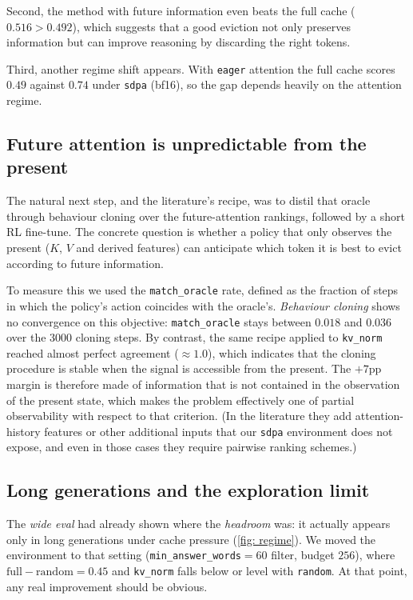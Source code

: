 Second, the method with future information even beats the full cache ($0.516 > 0.492$), which suggests that a good eviction not only preserves information but can improve reasoning by discarding the right tokens.

Third, another regime shift appears. With \texttt{eager} attention the full cache scores $0.49$ against $0.74$ under \texttt{sdpa} (bf16), so the gap depends heavily on the attention regime.

\subsection{Future attention is unpredictable from the present} \label{subsec: e5}

The natural next step, and the literature's recipe, was to distil that oracle through behaviour cloning over the future-attention rankings, followed by a short RL fine-tune. The concrete question is whether a policy that only observes the present ($K$, $V$ and derived features) can anticipate which token it is best to evict according to future information.

To measure this we used the \texttt{match\_oracle} rate, defined as the fraction of steps in which the policy's action coincides with the oracle's. \textit{Behaviour cloning} shows no convergence on this objective: \texttt{match\_oracle} stays between $0.018$ and $0.036$ over the 3000 cloning steps. By contrast, the same recipe applied to \texttt{kv\_norm} reached almost perfect agreement ($\approx 1.0$), which indicates that the cloning procedure is stable when the signal is accessible from the present.
The $+7$pp margin is therefore made of information that is not contained in the observation of the present state, which makes the problem effectively one of partial observability with respect to that criterion.
(In the literature they add attention-history features or other additional inputs that our \texttt{sdpa} environment does not expose, and even in those cases they require pairwise ranking schemes.)

\subsection{Long generations and the exploration limit} \label{subsec: longgen}

The \textit{wide eval} had already shown where the \textit{headroom} was: it actually appears only in long generations under cache pressure (\cref{fig: regime}). We moved the environment to that setting (\texttt{min\_answer\_words}$=60$ filter, budget $256$), where $\mathrm{full}-\mathrm{random}=0.45$ and \texttt{kv\_norm} falls below or level with \texttt{random}. At that point, any real improvement should be obvious.

